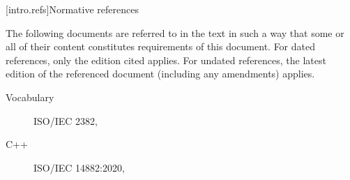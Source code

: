
[intro.refs]{Normative references}%
%

\pnum
{}%
The following documents are referred to in the text in such a way that some or
all of their content constitutes requirements of this document. For dated
references, only the edition cited applies. For undated references, the latest
edition of the referenced document (including any amendments) applies.

\begin{description}


\item[Vocabulary] ISO/IEC 2382, 
\item[C++] ISO/IEC 14882:2020, 


\end{description}
